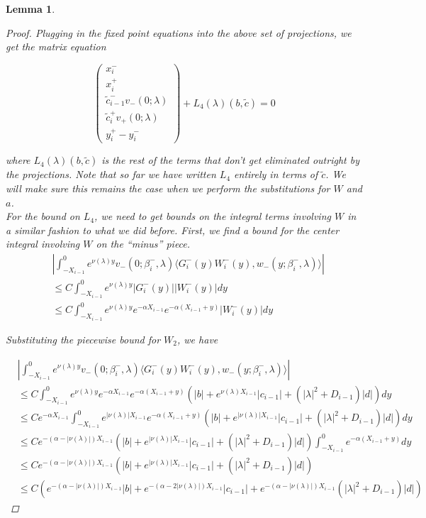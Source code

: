 \documentclass[12pt]{article}
\newtheorem{lemma}{Lemma}
\begin{document}
\begin{lemma}
\begin{proof}
Plugging in the fixed point equations into the above set of projections, we get the matrix equation

\[
\begin{pmatrix}x_i^- \\ x_i^+ \\ 
\tilde{c}_{i-1}^- v_-(0; \lambda) \\
\tilde{c}_i^+ v_+(0; \lambda) \\
y_i^+ - y_i^- \end{pmatrix} + L_4(\lambda)(b, \tilde{c}) = 0
\]

where $L_4(\lambda)(b, \tilde{c})$ is the rest of the terms that don't get eliminated outright by the projections. Note that so far we have written $L_4$ entirely in terms of $\tilde{c}$. We will make sure this remains the case when we perform the substitutions for $W$ and $a$.\\

For the bound on $L_4$, we need to get bounds on the integral terms involving $W$ in a similar fashion to what we did before. First, we find a bound for the center integral involving $W$ on the ``minus'' piece.\\

\begin{align*}
&\left| \int_{-X_{i-1}}^0
e^{\nu(\lambda)y} v_-(0; \beta_i^-, \lambda) \langle G_i^-(y)W_i^-(y), w_-(y; \beta_i^-, \lambda) \rangle \right| \\
&\leq C \int_{-X_{i-1}}^0 e^{\nu(\lambda)y} |G_i^-(y)| |W_i^-(y)| dy \\
&\leq C \int_{-X_{i-1}}^0 e^{\nu(\lambda)y} e^{-\alpha X_{i-1}} e^{-\alpha(X_{i-1} + y)} |W_i^-(y)| dy
\end{align*}

Substituting the piecewise bound for $W_2$, we have

\begin{align*}
&\left| \int_{-X_{i-1}}^0
e^{\nu(\lambda)y} v_-(0; \beta_i^-, \lambda) \langle G_i^-(y)W_i^-(y), w_-(y; \beta_i^-, \lambda) \rangle \right| \\
&\leq C \int_{-X_{i-1}}^0 e^{\nu(\lambda)y} e^{-\alpha X_{i-1}} e^{-\alpha(X_{i-1} + y)} ( |b| + e^{\nu(\lambda)X_{i-1}}|c_{i-1}| + (|\lambda|^2 + D_{i-1})|d| )dy \\
&\leq C e^{-\alpha X_{i-1}} \int_{-X_{i-1}}^0 e^{|\nu(\lambda)|X_{i-1}} e^{-\alpha(X_{i-1} + y)} ( |b| + e^{|\nu(\lambda)|X_{i-1}}|c_{i-1}| + (|\lambda|^2 + D_{i-1})|d| )dy \\
&\leq C e^{-(\alpha - |\nu(\lambda)|) X_{i-1}} ( |b| + e^{|\nu(\lambda)|X_{i-1}}|c_{i-1}| + (|\lambda|^2 + D_{i-1})|d| ) \int_{-X_{i-1}}^0 e^{-\alpha(X_{i-1} + y)} dy \\
&\leq C e^{-(\alpha - |\nu(\lambda)|) X_{i-1}} ( |b| + e^{|\nu(\lambda)|X_{i-1}}|c_{i-1}| + (|\lambda|^2 + D_{i-1})|d| ) \\
&\leq C ( e^{-(\alpha - |\nu(\lambda)|) X_{i-1}} |b| + e^{-(\alpha - 2 |\nu(\lambda)|) X_{i-1}}|c_{i-1}| + e^{-(\alpha - |\nu(\lambda)|) X_{i-1}} (|\lambda|^2 + D_{i-1})|d| )
\end{align*}


\end{proof}
\end{lemma}
\end{document}
